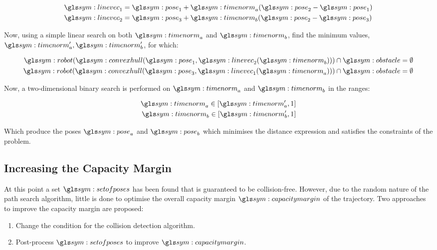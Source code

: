 		\begin{align}
			\linevec_1 &= \pose_1 + \timenorm_a(\pose_2 - \pose_1)\\
			\linevec_2 &= \pose_3 + \timenorm_b(\pose_2 - \pose_3)\\
		\end{align}

		Now, using a simple linear search on both $\timenorm_a$ and
		$\timenorm_b$, find the minimum values, $\timenorm_a',
		\timenorm_b'$, for which:

		\begin{align}
			\robot(\convexhull(\pose_1, \linevec_2(\timenorm_b))) \cap
				\obstacle = \emptyset\\
			\robot(\convexhull(\pose_3, \linevec_1(\timenorm_a))) \cap
				\obstacle = \emptyset
		\end{align}

		Now, a two-dimensional binary search is performed on $\timenorm_a$
		and $\timenorm_b$ in the ranges:

		\begin{align}
			\timenorm_a \in [\timenorm_a', 1]\\
			\timenorm_b \in [\timenorm_b', 1]
		\end{align}

		Which produce the poses $\pose_a$ and $\pose_b$ which minimises the
		distance expression and satisfies the constraints of the problem.

	\subsection{Increasing the Capacity Margin}%
	\label{sec:increasing_the_capacity_margin}


		At this point a set $\setofposes$ has been found that is guaranteed to
		be collision-free. However, due to the random nature of the path search
		algorithm, little is done to optimise the overall capacity margin
		$\capacitymargin$ of the trajectory. Two approaches to improve the
		capacity margin are proposed:

		\begin{enumerate}

			\item
				Change the condition for the collision detection algorithm.
				\label{option:change_collision_condition}

			\item
				Post-process $\setofposes$ to improve $\capacitymargin$.
				\label{option:post_process_set_of_poses}

		\end{enumerate}

